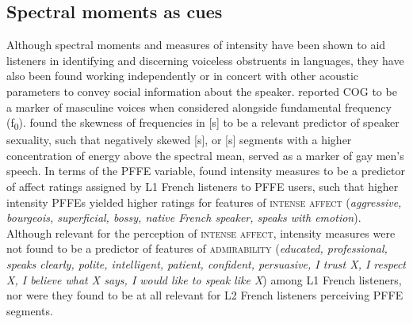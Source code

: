 \documentclass[output=paper,colorlinks,citecolor=brown,draftmode]{langscibook}
\begin{document}
\subsection{Spectral moments as cues}
Although spectral moments and measures of intensity have been shown to aid listeners in identifying and discerning voiceless obstruents in languages, they have also been found working independently or in concert with other acoustic parameters to convey social information about the speaker. \citet{zimman2017gender} reported COG to be a marker of masculine voices when considered alongside fundamental frequency (f\textsubscript{0}). \citet{munson2006acoustic} found the skewness of frequencies in [s] to be a relevant predictor of speaker sexuality, such that negatively skewed [s], or [s] segments with a higher concentration of energy above the spectral mean, served as a marker of gay men’s speech. In terms of the PFFE variable, \citet{dalola2016perception} found intensity measures to be a predictor of affect ratings assigned by L1 French listeners to PFFE users, such that higher intensity PFFEs yielded higher ratings for features of \textsc{intense affect} (\emph{aggressive, bourgeois, superficial, bossy, native French speaker, speaks with emotion}). Although relevant for the perception of \textsc{intense affect}, intensity measures were not found to be a predictor of features of \textsc{admirability} (\emph{educated, professional, speaks clearly, polite, intelligent, patient, confident, persuasive, I trust X, I respect X, I believe what X says, I would like to speak like X}) among L1 French listeners, nor were they found to be at all relevant for L2 French listeners perceiving PFFE segments.
\end{document}
